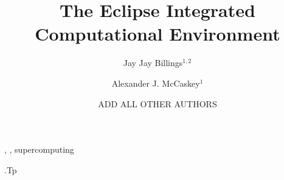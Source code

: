 \documentclass[]{elsart}
\begin{document}
\begin{frontmatter}

\title{The Eclipse Integrated Computational Environment}

\author{Jay Jay Billings$^{1,2}$}
\author{Alexander J. McCaskey$^{1}$}
\author{ADD ALL OTHER AUTHORS}


\address{$^1$Computer Science and Mathematics Division, Oak Ridge National
Laboratory, Oak Ridge, TN 37830, USA}
\address{$^2$The Bredesen Center for Interdisciplinary Research and Graduate
Education, University of Tennessee, Knoxville, TN 37996-1200, USA}


\begin{keyword}
\sep 
\sep 
supercomputing

\vspace{1ex}

.Tp %

\end{keyword}

\end{frontmatter}







\end{document}
